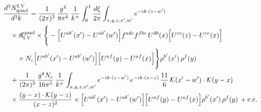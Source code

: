 \begingroup\small
\begin{align}\label{eq:H-I.V-2o}
&\frac{d^{3}N^{\rm I.V}_{{\rm quad}}}{d^{3}k}=\frac{1}{(2\pi)^{3}}\, \frac{g^{4}}{8\pi^{4}}\, \frac{1}{k^{+}} \int_{0}^{1}\frac{d\xi}{2\pi} \int_{x,y,z,x',w'}e^{-ik\cdot(z-w')}\notag\\
&\quad \times \mathfrak{K}^{\rm quad}_{\rm I.V} \times\Bigg\{-\Big[U^{ab'}(x')-U^{ab'}(w')\Big]f^{adc}f^{fbe}\, U^{db}(x)\Big[U^{ce}(z)-U^{ce}(x)\Big]\notag\\
&\quad\quad +N_{c}\Big[U^{ab'}(x')-U^{ab'}(w')\Big]\Big[U^{af}(y)-U^{af}(x)\Big]\Bigg\}\rho^{b'}(x')\, \rho^{f}(y)\notag\\
&\quad +\frac{1}{(2\pi)^{3}}\, \frac{g^{4}N_{c}}{16\pi^{5}}\, \frac{1}{k^{+}} \int_{x,y,z,x',w'}e^{-ik\cdot(z-w')}\, e^{-ik\cdot(x-z)}\, \frac{11}{6}\, \mathcal{K}(x'-w')\cdot\mathcal{K}(y-x)\notag\\
&\quad \times \frac{(y-x)\cdot\mathcal{K}(y-z)}{(x-z)^{2}} \times\Big[U^{ab'}(x')-U^{ab'}(w')\Big]\Big[U^{af}(y)-U^{af}(x)\Big]\rho^{b'}(x')\, \rho^{f}(y)\, + {\rm c.c.}
\end{align}
\endgroup
